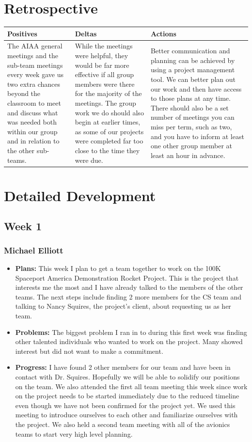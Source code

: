 \documentclass[onecolumn, draftclsnofoot,10pt, compsoc]{IEEEtran}
\begin{document}
\section {Retrospective}
\begin {center}
 \begin {tabular} { | p{5cm} | p{5cm} | p{5cm} | }
 \hline
 Positives & Deltas & Actions \\
 \hline
 The AIAA general meetings and the sub-team meetings every week gave us two extra chances beyond the classroom to meet and discuss what was needed both within our group and in relation to the other sub-teams. & While the meetings were helpful, they would be far more effective if all group members were there for the majority of the meetings. The group work we do should also begin at earlier times, as some of our projects were completed far too close to the time they were due. & Better communication and planning can be achieved by using a project management tool. We can better plan out our work and then have access to those plans at any time. There should also be a set number of meetings you can miss per term, such as two, and you have to inform at least one other group member at least an hour in advance. \\
 \hline
 \end {tabular}
\end {center} 
\section {Detailed Development}
\subsection {Week 1}
\subsubsection{Michael Elliott}
\begin {itemize}
\item \textbf{Plans: }
 This week I plan to get a team together to work on the 100K Spaceport America Demonstration Rocket Project. This is the project that interests me the most and I have already talked to the members of the other teams. The next steps include finding 2 more members for the CS team and talking to Nancy Squires, the project's client, about requesting us as her team.
\item \textbf{Problems: }
  The biggest problem I ran in to during this first week was finding other talented individuals who wanted to work on the project. Many showed interest but did not want to make a commitment.
\item \textbf{Progress: }
  I have found 2 other members for our team and have been in contact with Dr. Squires. Hopefully we will be able to solidify our positions on the team. We also attended the first all team meeting this week since work on the project needs to be started immediately due to the reduced timeline even though we have not been confirmed for the project yet. We used this meeting to introduce ourselves to each other and familiarize ourselves with the project. We also held a second team meeting with all of the avionics teams to start very high level planning.
\end {itemize}
\end{document}
